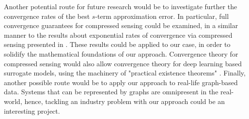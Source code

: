 \documentclass[12pt, oneside]{report}   	%
\begin{document}
Another potential route for future research would be to investigate further the convergence rates of the best $s$-term approximation error. In particular, full convergence guarantees for compressed sensing could be examined, in a similar manner to the results about exponential rates of convergence via compressed sensing presented in \cite{sparsepoly}. These results could be applied to our case, in order to solidify the mathematical foundations of our approach. Convergence theory for compressed sensing would also allow convergence theory for deep learning based surrogate models, using the machinery of "practical existence theorems" \cite{pmlr-v145-adcock22a, adcock2021gap}. Finally, another possible route would be to apply our approach to real-life graph-based data. Systems that can be represented by graphs are omnipresent in the real-world, hence, tackling an industry problem with our approach could be an interesting project.






\newpage


\printbibliography[heading=bibintoc, title={References}]
\end{document}
